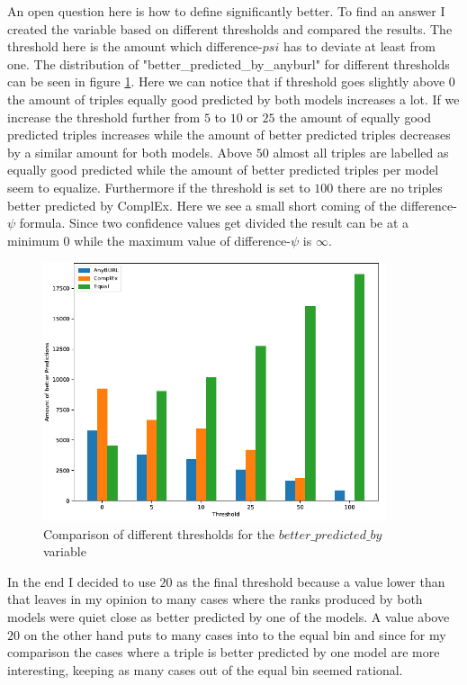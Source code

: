 An open question here is how to define significantly better. To find an answer I created the variable based on different thresholds and compared the results. The threshold here is the amount which difference-$psi$ has to deviate at least from one. The distribution of "better\_predicted\_by\_anyburl" for different thresholds can be seen in figure \ref{fig:difference_psi_threshold_anyburl_complex_codex}. Here we can notice that if threshold goes slightly above $0$ the amount of triples equally good predicted by both models increases a lot. If we increase the threshold further from $5$ to $10$ or $25$ the amount of equally good predicted triples increases while the amount of better predicted triples decreases by a similar amount for both models. Above $50$ almost all triples are labelled as equally good predicted while the amount of better predicted triples per model seem to equalize. Furthermore if the threshold is set to $100$ there are no triples better predicted by ComplEx. Here we see a small short coming of the difference-$\psi$ formula. Since two confidence values get divided the result can be at a minimum $0$ while the maximum value of difference-$\psi$ is $\infty$. 

\begin{figure}[H]
\centering
\includegraphics[width=0.9\textwidth]{images/difference_psi_threshold_anyburl_complex_codex.PNG}
\caption{Comparison of different thresholds for the $better\_predicted\_by$ variable}
\label{fig:difference_psi_threshold_anyburl_complex_codex}
\end{figure}

In the end I decided to use $20$ as the final threshold because a value lower than that leaves in my opinion to many cases where the ranks produced by both models were quiet close as better predicted by one of the models. A value above $20$ on the other hand puts to many cases into to the equal bin and since for my comparison the cases where a triple is better predicted by one model are more interesting, keeping as many cases out of the equal bin seemed rational. 

